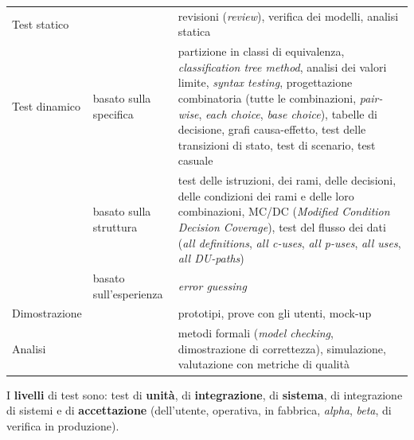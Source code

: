 \begin{center}
\small
\renewcommand{\arraystretch}{1.15}
\begin{tabular}{>{\raggedright\arraybackslash}p{2.5cm}>{\raggedright\arraybackslash}p{3.3cm}%
                >{\raggedright\arraybackslash}p{9.2cm}}
  \multicolumn{3}{l}{\textbf{Tecniche di verifica e convalida}} \\ \hline
  Test statico & & revisioni (\textit{review}), verifica dei modelli, analisi statica \\ \hline
  Test dinamico & basato sulla specifica & partizione in classi di equivalenza, \textit{classification tree method},
    analisi dei valori limite, \textit{syntax testing}, progettazione combinatoria (tutte le combinazioni,
    \textit{pair-wise}, \textit{each choice}, \textit{base choice}), tabelle di decisione, grafi causa-effetto,
    test delle transizioni di stato, test di scenario, test casuale \\
  & basato sulla struttura & test delle istruzioni, dei rami, delle decisioni, delle condizioni dei rami e delle
    loro combinazioni, MC/DC (\textit{Modified Condition Decision Coverage}), test del flusso dei dati (\textit{all
    definitions}, \textit{all c-uses}, \textit{all p-uses}, \textit{all uses}, \textit{all DU-paths}) \\
  & basato sull'esperienza & \textit{error guessing} \\ \hline
  Dimostrazione & & prototipi, prove con gli utenti, mock-up \\ \hline
  Analisi & & metodi formali (\textit{model checking}, dimostrazione di correttezza), simulazione, valutazione con
    metriche di qualità \\
\end{tabular}
\end{center}

I \textbf{livelli} di test sono: test di \textbf{unità}, di \textbf{integrazione}, di \textbf{sistema}, di integrazione
di sistemi e di \textbf{accettazione} (dell'utente, operativa, in fabbrica, \textit{alpha}, \textit{beta}, di verifica
in produzione).

